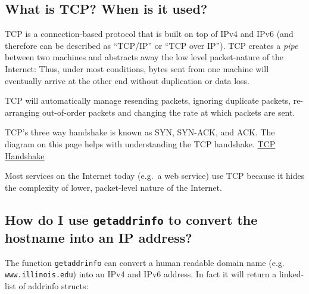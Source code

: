 \subsection{What is TCP? When is it
used?}\label{what-is-tcp-when-is-it-used}

TCP is a connection-based protocol that is built on top of IPv4 and IPv6
(and therefore can be described as ``TCP/IP'' or ``TCP over IP''). TCP
creates a \emph{pipe} between two machines and abstracts away the low
level packet-nature of the Internet: Thus, under most conditions, bytes
sent from one machine will eventually arrive at the other end without
duplication or data loss.

TCP will automatically manage resending packets, ignoring duplicate
packets, re-arranging out-of-order packets and changing the rate at
which packets are sent.

TCP's three way handshake is known as SYN, SYN-ACK, and ACK. The diagram
on this page helps with understanding the TCP handshake.
\href{http://www.inetdaemon.com/tutorials/internet/tcp/3-way_handshake.shtml}{TCP
Handshake}

Most services on the Internet today (e.g.~a web service) use TCP because
it hides the complexity of lower, packet-level nature of the Internet.

\subsection{\texorpdfstring{How do I use \texttt{getaddrinfo} to convert
the hostname into an IP
address?}{How do I use getaddrinfo to convert the hostname into an IP address?}}\label{how-do-i-use-getaddrinfo-to-convert-the-hostname-into-an-ip-address}

The function \texttt{getaddrinfo} can convert a human readable domain
name (e.g. \texttt{www.illinois.edu}) into an IPv4 and IPv6 address. In
fact it will return a linked-list of addrinfo structs:

\begin{Shaded}
\begin{Highlighting}[]
 
                  
                  
                  
                  
     
                
     
\NormalTok{\};}
\end{Highlighting}
\end{Shaded}

